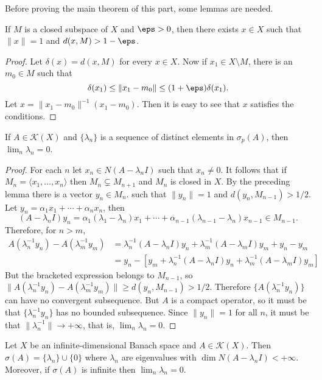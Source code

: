 Before proving the main theorem of this part, some lemmas are needed.
\begin{lemma}\label{Banach space closed subspace diatance lemma}
If $M$ is a closed subspace of $X$ and $\eps>0$, then there exists $x\in X$ such that $\|x\|=1$ and $d(x,M)>1-\eps$.
\end{lemma}
\begin{proof}
Let $\delta(x)=d(x,M)$ for every $x\in X$. Now if $x_1\in X\setminus M$, there is an $m_0\in M$ such that
\[\delta(x_1)\leq\|x_1-m_0\|\leq(1+\eps)\delta(x_1).\]
Let $x=\|x_1-m_0\|^{-1}(x_1-m_0)$. Then it is easy to see that $x$ satisfies the conditions.
\end{proof}
\begin{lemma}\label{Banach space compact spectrum zero limit}
If $A\in\mathcal{K}(X)$ and $\{\lambda_n\}$ is a sequence of distinct elements in $\sigma_p(A)$, then $\lim_n\lambda_n=0$.
\end{lemma}
\begin{proof}
For each $n$ let $x_n\in N(A-\lambda_nI)$ such that $x_n\neq 0$. It follows that if $M_n=\langle x_1,\dots,x_n\rangle$ then $M_n\subsetneq M_{n+1}$ and $M_n$ is closed in $X$. By the preceding lemma there is a vector $y_n\in M_n$. such that $\|y_n\|=1$ and $d(y_n,M_{n-1})>1/2$. Let $y_n=\alpha_1x_1+\cdots+\alpha_nx_n$, then
\[(A-\lambda_nI)y_n=\alpha_1(\lambda_1-\lambda_n)x_1+\cdots+\alpha_{n-1}(\lambda_{n-1}-\lambda_n)x_{n-1}\in M_{n-1}.\]
Therefore, for $n>m$,
\begin{align*}
A(\lambda_n^{-1}y_n)-A(\lambda_m^{-1}y_m)&=\lambda_n^{-1}(A-\lambda_nI)y_n+\lambda_m^{-1}(A-\lambda_mI)y_m+y_n-y_m\\
&=y_n-[y_m+\lambda_n^{-1}(A-\lambda_nI)y_n+\lambda_m^{-1}(A-\lambda_mI)y_m]
\end{align*}
But the bracketed expression belongs to $M_{n-1}$, so $\|A(\lambda_n^{-1}y_n)-A(\lambda_m^{-1}y_m)\|\geq d(y_n,M_{n-1})>1/2$. Therefore $\{A(\lambda_n^{-1}y_n)\}$ can have no convergent subsequence. But $A$ is a compact operator, so it must be that $\{\lambda_n^{-1}y_n\}$ has no bounded subsequence. Since $\|y_n\|=1$ for all $n$, it must be that $\|\lambda_n^{-1}\|\to+\infty$, that is, $\lim_n\lambda_n=0$.
\end{proof}
\begin{theorem}\label{Banach space spectrum of compact operator}
Let $X$ be an infinite-dimensional Banach space and $A\in\mathcal{K}(X)$. Then $\sigma(A)=\{\lambda_n\}\cup\{0\}$ where $\lambda_n$ are eigenvalues with $\dim N(A-\lambda_nI)<+\infty$. Moreover, if $\sigma(A)$ is infinite then $\lim_n\lambda_n=0$.
\end{theorem}
